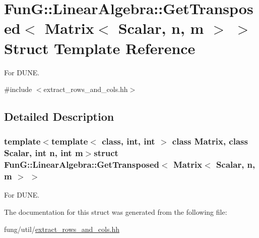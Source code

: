 \hypertarget{structFunG_1_1LinearAlgebra_1_1GetTransposed_3_01Matrix_3_01Scalar_00_01n_00_01m_01_4_01_4}{\section{\-Fun\-G\-:\-:\-Linear\-Algebra\-:\-:\-Get\-Transposed$<$ \-Matrix$<$ \-Scalar, n, m $>$ $>$ \-Struct \-Template \-Reference}
\label{structFunG_1_1LinearAlgebra_1_1GetTransposed_3_01Matrix_3_01Scalar_00_01n_00_01m_01_4_01_4}
}


\-For \-D\-U\-N\-E.  




{\ttfamily \#include $<$extract\-\_\-rows\-\_\-and\-\_\-cols.\-hh$>$}



\subsection{\-Detailed \-Description}
\subsubsection*{template$<$template$<$ class, int, int $>$ class \-Matrix, class Scalar, int n, int m$>$struct Fun\-G\-::\-Linear\-Algebra\-::\-Get\-Transposed$<$ Matrix$<$ Scalar, n, m $>$ $>$}

\-For \-D\-U\-N\-E. 

\-The documentation for this struct was generated from the following file\-:\begin{DoxyCompactItemize}
\item 
fung/util/\hyperlink{extract__rows__and__cols_8hh}{extract\-\_\-rows\-\_\-and\-\_\-cols.\-hh}\end{DoxyCompactItemize}
